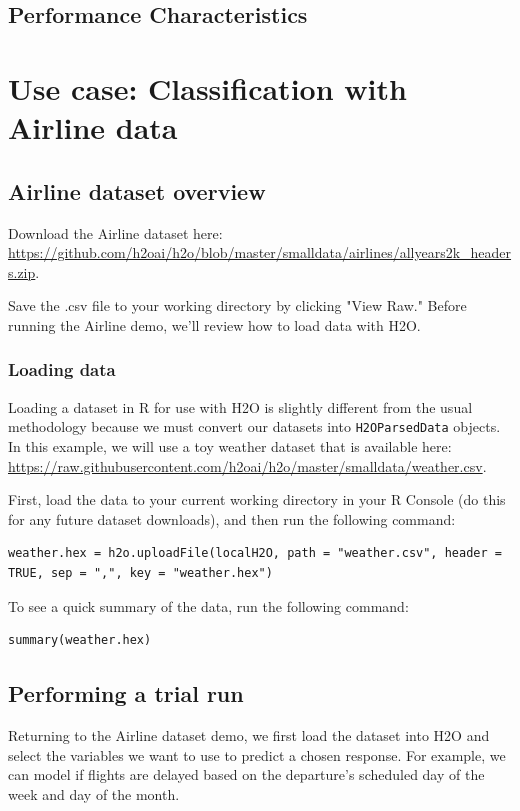 \subsection{Performance Characteristics}


\section{Use case: Classification with Airline data}

\subsection{Airline dataset overview} 

Download the Airline dataset here: {\url{https://github.com/h2oai/h2o/blob/master/smalldata/airlines/allyears2k_headers.zip}}.

Save the .csv file to your working directory by clicking  "View Raw."  Before running the Airline demo, we'll review how to load data with H2O. 

\subsubsection{Loading data} \label{2.5}

Loading a dataset in R for use with H2O is slightly different from the usual methodology because we must convert our datasets into \texttt{H2OParsedData} objects. In this example, we will use a toy weather dataset that is available here: {\url{https://raw.githubusercontent.com/h2oai/h2o/master/smalldata/weather.csv}}. 

First, load the data to your current working directory in your R Console (do this for any future dataset downloads), and then run the following command:
\begin{lstlisting}[style=R]
weather.hex = h2o.uploadFile(localH2O, path = "weather.csv", header = TRUE, sep = ",", key = "weather.hex")
\end{lstlisting}
\bigskip

To see a quick summary of the data, run the following command:
\begin{lstlisting}[style=R]
summary(weather.hex)
\end{lstlisting}

\subsection{Performing a trial run} \label{3.2}
Returning to the Airline dataset demo, we first load the dataset into H2O and select the variables we want to use to predict a chosen response. For example, we can model if flights are delayed based on the departure's scheduled day of the week and day of the month.

